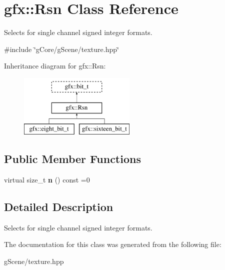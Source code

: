 \hypertarget{classgfx_1_1Rsn}{\section{gfx\-:\-:Rsn Class Reference}
\label{classgfx_1_1Rsn}
}


Selects for single channel signed integer formats.  




{\ttfamily \#include \char`\"{}g\-Core/g\-Scene/texture.\-hpp\char`\"{}}

Inheritance diagram for gfx\-:\-:Rsn\-:\begin{figure}[H]
\begin{center}
\leavevmode
\includegraphics[height=3.000000cm]{classgfx_1_1Rsn}
\end{center}
\end{figure}
\subsection*{Public Member Functions}
\begin{DoxyCompactItemize}
\item 
\hypertarget{classgfx_1_1Rsn_ad82b30257dd6df635e7d2c985974a2c7}{virtual size\-\_\-t {\bfseries n} () const =0}\label{classgfx_1_1Rsn_ad82b30257dd6df635e7d2c985974a2c7}

\end{DoxyCompactItemize}


\subsection{Detailed Description}
Selects for single channel signed integer formats. 

The documentation for this class was generated from the following file\-:\begin{DoxyCompactItemize}
\item 
g\-Scene/texture.\-hpp\end{DoxyCompactItemize}
